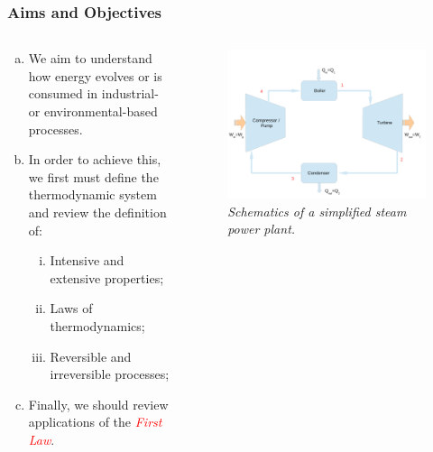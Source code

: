 \documentclass[10pt,compress]{beamer}
\begin{document}
\begin{frame}
 \frametitle{Aims and Objectives}
  \begin{columns}
    \begin{column}[l]{0.6\linewidth}
     \begin{enumerate}[(a)]
      \item <1-> We aim to understand how energy evolves or is consumed in industrial- or environmental-based processes.
      \item <2-> In order to achieve this, we first must define the thermodynamic system and review the definition of:
       \begin{enumerate}[(i)]
        \item <2-> Intensive and extensive properties;
        \item <2-> Laws of thermodynamics;
        \item <2-> Reversible and irreversible processes;
       \end{enumerate}
      \item <3->Finally, we should review applications of the \textcolor{red}{{\it First Law}}. 
     \end{enumerate}
    \end{column}
     \begin{column}[l]{0.4\linewidth}
      \begin{figure}%
        \begin{center}
          \includegraphics[width=\columnwidth,clip]{./Pics/Fig_SteamPowerPlant2}
           \caption{{\it Schematics of a simplified steam power plant.}} 
        \end{center}
      \end{figure}
    \end{column}
  \end{columns}
\end{frame}
\end{document}
